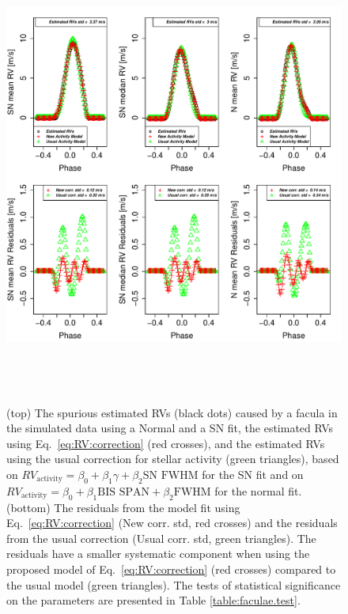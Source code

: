 \documentclass{aa}
\begin{document}
\begin{figure}[htbp]
\begin{center}
\includegraphics[height = 6in]{FACULAE_NEW_CORRECTION_[3]CorrectionActivity_RadialVelocity_vs_time.pdf} 
   \caption{(top) The spurious estimated RVs (black dots) caused by a facula in the simulated data using a Normal and a SN fit, the estimated RVs using Eq.~\ref{eq:RV:correction} (red crosses), and the estimated RVs using the usual correction for stellar activity (green triangles), based on $RV_{\text{activity}}=\beta_0+\beta_1 \gamma + \beta_2 \text{SN FWHM}$ for the SN fit and on $RV_{\text{activity}}=\beta_0+\beta_1 \text{BIS SPAN} + \beta_2 \text{FWHM}$ for the normal fit.    
 (bottom) The residuals from the model fit using Eq.~\ref{eq:RV:correction} (New corr. std, red crosses) and the residuals from the usual correction (Usual corr. std, green triangles). The residuals have a smaller systematic component when using the proposed model of 
  Eq.~\ref{eq:RV:correction} (red crosses) compared to the usual model (green triangles).
The tests of statistical significance on the parameters are presented in Table \ref{table:faculae.test}.
}\label{fig:faculae.correction}
\end{center}
\end{figure}
\end{document}
